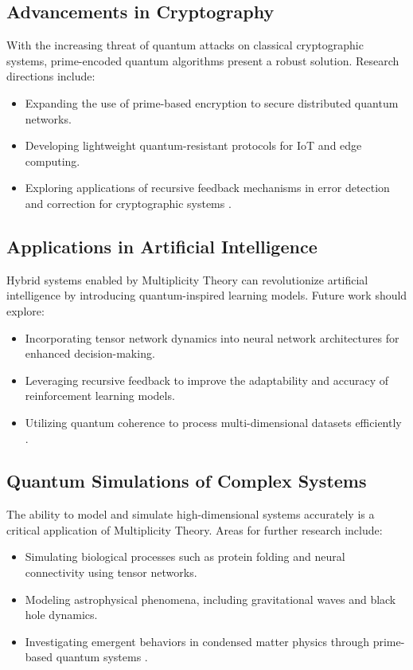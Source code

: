 \documentclass{article}
\theoremstyle{plain}
\begin{document}
\subsection{Advancements in Cryptography}
With the increasing threat of quantum attacks on classical cryptographic systems, prime-encoded quantum algorithms present a robust solution. Research directions include:
\begin{itemize}
    \item Expanding the use of prime-based encryption to secure distributed quantum networks.
    \item Developing lightweight quantum-resistant protocols for IoT and edge computing.
    \item Exploring applications of recursive feedback mechanisms in error detection and correction for cryptographic systems \cite{shor1999algorithms}.
\end{itemize}

\subsection{Applications in Artificial Intelligence}
Hybrid systems enabled by Multiplicity Theory can revolutionize artificial intelligence by introducing quantum-inspired learning models. Future work should explore:
\begin{itemize}
    \item Incorporating tensor network dynamics into neural network architectures for enhanced decision-making.
    \item Leveraging recursive feedback to improve the adaptability and accuracy of reinforcement learning models.
    \item Utilizing quantum coherence to process multi-dimensional datasets efficiently \cite{biamonte2017tensor, preskill2018quantum}.
\end{itemize}

\subsection{Quantum Simulations of Complex Systems}
The ability to model and simulate high-dimensional systems accurately is a critical application of Multiplicity Theory. Areas for further research include:
\begin{itemize}
    \item Simulating biological processes such as protein folding and neural connectivity using tensor networks.
    \item Modeling astrophysical phenomena, including gravitational waves and black hole dynamics.
    \item Investigating emergent behaviors in condensed matter physics through prime-based quantum systems \cite{biamonte2017tensor}.
\end{itemize}
\end{document}
